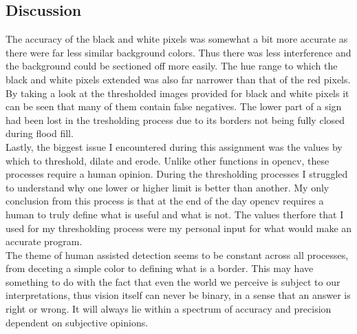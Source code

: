 \documentclass{article}
\begin{document}
\pagebreak
\subsection{Discussion}\label{sec:intro}
The accuracy of the black and white pixels was somewhat a bit more accurate as there were far less similar background colors. Thus there was less interference and the background could be sectioned off more easily. The hue range to which the black and white pixels extended was also far narrower than that of the red pixels.\\
By taking a look at the thresholded images provided for black and white pixels it can be seen that many of them contain false negatives. The lower part of a sign had been lost in the tresholding process due to its borders not being fully closed during flood fill. \\
Lastly, the biggest issue I encountered during this assignment was the values by which to threshold, dilate and erode. Unlike other functions in opencv, these processes require a human opinion. During the thresholding processes I struggled to understand why one lower or higher limit is better than another. My only conclusion from this process is that at the end of the day opencv requires a human to truly define what is useful and what is not. The values therfore that I used for my thresholding process were my personal input for what would make an accurate program.\\
The theme of human assisted detection seems to be constant across all processes, from deceting a simple color to defining what is a border. This may have something to do with the fact that even the world we perceive is subject to our interpretations, thus vision itself can never be binary, in a sense that an answer is right or wrong. It will always lie within a spectrum of accuracy and precision dependent on subjective opinions.




\pagebreak
\end{document}
